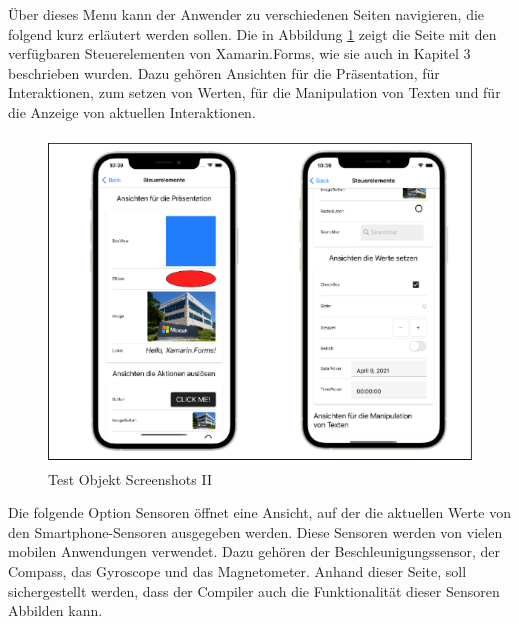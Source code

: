 Über dieses Menu kann der Anwender zu verschiedenen Seiten navigieren, die folgend kurz erläutert werden sollen.  Die in Abbildung \ref{fig:TestObjectII} zeigt die Seite mit den verfügbaren Steuerelementen von Xamarin.Forms,  wie sie auch in Kapitel 3 beschrieben wurden. Dazu gehören Ansichten für die Präsentation, für Interaktionen, zum setzen von Werten, für die Manipulation von Texten und für die Anzeige von aktuellen Interaktionen.
\begin{figure}[!ht]
 \includegraphics[width=\textwidth,keepaspectratio]{Images/Screenshot/Controls.png}
 \caption{Test Objekt Screenshots II}
 \label{fig:TestObjectII}
\end{figure}

Die folgende Option Sensoren öffnet eine Ansicht, auf der die aktuellen Werte von den Smartphone-Sensoren ausgegeben werden.  Diese Sensoren werden von vielen mobilen Anwendungen verwendet. Dazu gehören der Beschleunigungssensor, der Compass,  das Gyroscope und das Magnetometer.  Anhand dieser Seite,  soll sichergestellt werden, dass der Compiler auch die Funktionalität dieser Sensoren Abbilden kann. 

